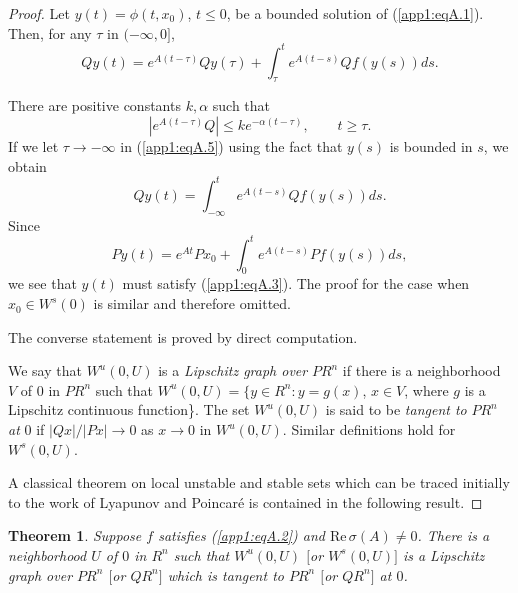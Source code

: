 \documentclass{surv-l}
\theoremstyle{plain}
\newtheorem{theorem}{Theorem}[section]
\theoremstyle{definition}
\numberwithin{equation}{section}
\numberwithin{figure}{chapter}
\begin{document}
\begin{proof}Let $y(t)=\phi(t,x_{0})$, $t\leq 0$, be a bounded solution of (\ref{app1:eqA.1}). Then, for any $\tau$ in $(-\infty, 0]$,
\begin{equation}\label{app1:eqA.5}
Qy(t)=e^{A(t-\tau)}Qy(\tau)+\int_{\tau}^{t}e^{A(t-s)}Qf(y(s))ds.
\end{equation}

There are positive constants $k,\alpha$ such that
\begin{equation}\label{app1:eqA.6}
|e^{A(t-\tau)}Q|\leq ke^{-\alpha(t-\tau)},\qquad t\geq\tau.
\end{equation}
If we let $\tau\rightarrow -\infty$ in (\ref{app1:eqA.5}) using the fact that $y(s)$ is bounded in $s$, we obtain
\begin{equation*}
Qy(t)=\int_{-\infty}^{t}e^{A(t-s)}Qf(y(s))ds.
\end{equation*}
Since
\begin{equation*}
Py(t)=e^{At}Px_{0}+\int_{0}^{t}e^{A(t-s)}Pf(y(s))ds,
\end{equation*}
we see that $y(t)$ must satisfy (\ref{app1:eqA.3}). The proof for the case when $x_{0}\in W^{s}(0)$ is similar and therefore omitted.

The converse statement is proved by direct computation.

We say that $W^{u}(0, U)$ is a \emph{Lipschitz graph over} $PR^{n}$ if there is a neighborhood $V$ of $0$ in $PR^{n}$ such that $W^{u}(0, U)=\{y\in R^{n}$:$\,y =g(x)$, $x\in V$, where $g$ is a Lipschitz continuous function\}. The set $W^{u}(0, U)$ is said to be \emph{tangent to} $PR^{n}$ \emph{at} $0$ if $|Qx|/|Px|\rightarrow 0$ as $x\rightarrow 0$ in $W^{u}(0, U)$. Similar definitions hold for $W^{s}(0, U)$.

A classical theorem on local unstable and stable sets which can be traced initially to the work of Lyapunov and Poincar\'{e} is contained in the following result.
\end{proof}
\begin{theorem}\label{app1:thmA.2}
Suppose $f$ satisfies \emph{(\ref{app1:eqA.2})} and $\mathrm{Re}\,\sigma(A)\neq 0$. There is a neighborhood $U$ of $0$ in $R^{n}$ such that $W^{u}(0, U)$ $[$or $W^{s}(0, U)]$ is a Lipschitz graph over $PR^{n}$ $[$or $QR^{n}]$ which is tangent to $PR^{n}$ $[$or $QR^{n}]$ at $0$.
\end{theorem}
\end{document}

